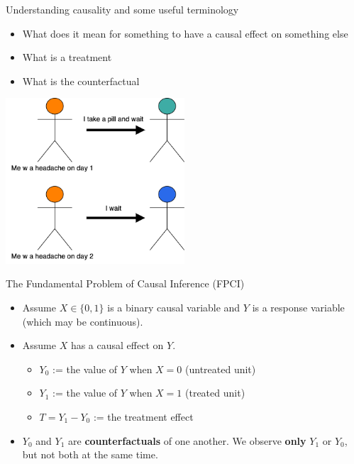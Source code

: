 \documentclass{beamer}
\begin{document}

\begin{frame}{Understanding causality and some useful terminology}
  \begin{itemize}
    \item<+-> What does it mean for something to have a causal effect on something else
    \item<+-> What is a treatment
    \item<+-> What is the counterfactual
  \end{itemize}
    \centering
    \includegraphics[width=0.5\textwidth]{images/headache-treatment-effect.png}
\end{frame}

\begin{frame}{The Fundamental Problem of Causal Inference (FPCI)}
  \begin{itemize}
    \item<+-> Assume $X \in\{0,1\}$ is a binary causal variable and $Y$ is a response variable (which may be continuous).
    \item<+-> Assume $X$ has a causal effect on $Y$.
    \begin{itemize}
      \item $Y_0$ := the value of $Y$ when $X=0$ (untreated unit)
      \item $Y_1$ := the value of $Y$ when $X=1$ (treated unit)
      \item $T = Y_1 - Y_0$ := the treatment effect
    \end{itemize}
    \item<+-> $Y_0$ and $Y_1$ are \textbf{counterfactuals} of one another. We observe \textbf{only} $Y_1$ or $Y_0$, but not both at the same time.
  \end{itemize}
\end{frame}
\end{document}
